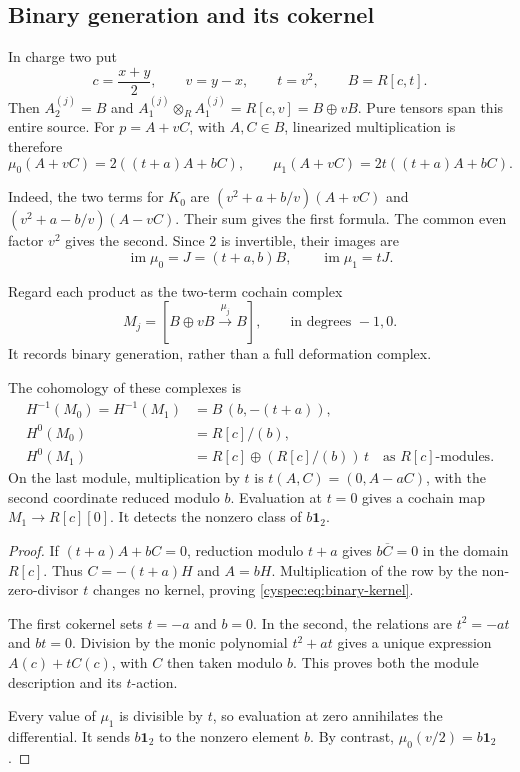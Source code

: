 \subsection{Binary generation and its cokernel}

In charge two put
\[
 c=\frac{x+y}{2},\qquad v=y-x,\qquad t=v^2,\qquad B=R[c,t].
\]
Then $A_2^{(j)}=B$ and
$A_1^{(j)}\otimes_R A_1^{(j)}=R[c,v]=B\oplus vB$.
Pure tensors span this entire source. For $p=A+vC$, with $A,C\in B$,
linearized multiplication is therefore
\begin{equation}\label{cyspec:eq:binary-rows}
 \mu_0(A+vC)=2((t+a)A+bC),\qquad
 \mu_1(A+vC)=2t((t+a)A+bC).
\end{equation}

Indeed, the two terms for $K_0$ are
$(v^2+a+b/v)(A+vC)$ and $(v^2+a-b/v)(A-vC)$.
Their sum gives the first formula. The common even factor $v^2$
gives the second. Since $2$ is invertible, their images are
\begin{equation}\label{cyspec:eq:binary-images}
 \operatorname{im}\mu_0=J=(t+a,b)B,\qquad
 \operatorname{im}\mu_1=tJ.
\end{equation}

Regard each product as the two-term cochain complex
\[
 M_j=[B\oplus vB\xrightarrow{\mu_j}B],
 \qquad\text{in degrees }-1,0.
\]
It records binary generation, rather than a full deformation complex.

\begin{proposition}\label{cyspec:prop:binary-cohomology}
The cohomology of these complexes is
\begin{align}
 H^{-1}(M_0)=H^{-1}(M_1)&=B\,(b,-(t+a)),
       \label{cyspec:eq:binary-kernel}\\
 H^0(M_0)&=R[c]/(b),\label{cyspec:eq:first-cokernel}\\
 H^0(M_1)&=R[c]\oplus (R[c]/(b))\,t
       \quad\text{as }R[c]\text{-modules}.
       \label{cyspec:eq:second-cokernel}
\end{align}
On the last module, multiplication by $t$ is
$t(A,C)=(0,A-aC)$, with the second coordinate reduced modulo $b$.
Evaluation at $t=0$ gives a cochain map $M_1\to R[c][0]$.
It detects the nonzero class of $b\mathbf1_2$.
\end{proposition}

\begin{proof}
If $(t+a)A+bC=0$, reduction modulo $t+a$ gives $b\overline C=0$
in the domain $R[c]$. Thus $C=-(t+a)H$ and $A=bH$.
Multiplication of the row by the non-zero-divisor $t$ changes no
kernel, proving \eqref{cyspec:eq:binary-kernel}.

The first cokernel sets $t=-a$ and $b=0$.
In the second, the relations are $t^2=-at$ and $bt=0$.
Division by the monic polynomial $t^2+at$ gives a unique expression
$A(c)+tC(c)$, with $C$ then taken modulo $b$.
This proves both the module description and its $t$-action.

Every value of $\mu_1$ is divisible by $t$, so evaluation at zero
annihilates the differential. It sends $b\mathbf1_2$ to the nonzero
element $b$. By contrast, $\mu_0(v/2)=b\mathbf1_2$.
\end{proof}

